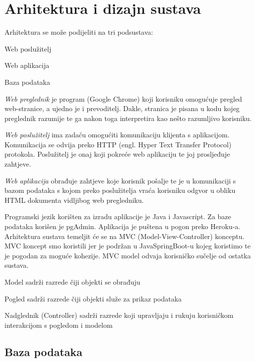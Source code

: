 \chapter{Arhitektura i dizajn sustava}
		

	\text Arhitektura se može podijeliti na tri podsustava:
	\begin{packed_item}
		\item Web poslužitelj
		\item Web aplikacija
		\item Baza podataka
	\end{packed_item}

	 \textit{Web preglednik} je program (Google Chrome) koji korisniku omogućuje pregled web-stranice, a ujedno je i prevoditelj. Dakle, stranica je pisana u kodu kojeg preglednik razumije te ga nakon toga interpretira kao nešto razumljivo korisniku.
	 
	 
	 \textit{Web poslužitelj} ima zadaću omogućiti komunikaciju klijenta s aplikacijom. Komunikacija se odvija preko HTTP (engl. Hyper Text Transfer Protocol) protokola. 
	 Poslužitelj je onaj koji pokreće web aplikaciju te joj prosljeđuje zahtjeve.

	 
	 \textit{Web aplikacija} obrađuje zahtjeve koje korisnik pošalje te je u komunikaciji s bazom podataka s kojom preko poslužitelja vraća korisniku odgvor u obliku HTML dokumenta vidljibog web pregledniku.
	 
	 Programski jezik korišten za izradu aplikacije je Java i Javascript. Za baze podataka korišen je pgAdmin. Aplikacija je puštena u pogon preko Heroku-a.
	 Arhitektura sustava temeljit će se na MVC (Model-View-Controller) konceptu. MVC koncept smo koristili jer je podržan u JavaSpringBoot-u kojeg koristimo te je pogodan za moguće kohezije.
	 MVC model odvaja korisničko sučelje od ostatka sustava.
	\begin{packed_item}
		\item Model sadrži razrede čiji objekti se obrađuju

		\item Pogled sadrži razrede čiji objekti služe za prikaz podataka

		\item Nadglednik (Controller) sadrži razrede koji upravljaju i rukuju korisničkom interakcijom s pogledom i modelom

	\end{packed_item}
	
		\newpage		
		\section{Baza podataka}
			
